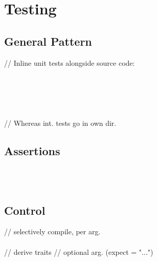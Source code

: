 \section{Testing}
\subsection*{General Pattern}
// Inline unit tests alongside source code: \\
 \\
 \\
\code{    \phantom{xx} \#[test]} \\
 \\ 
\code{\}} \\
// Whereas int. tests go in own  dir. \\
\subsection*{Assertions}
 \\
 \\
\subsection*{Control}
 // selectively compile, per arg. \\
\code{\#[test]} \\
 // derive traits
 // optional arg. (expect = "...")
\code{\#[ignore]} \\